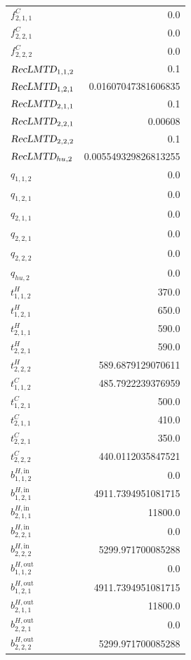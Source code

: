 \documentclass{article}%
\begin{document}
\begin{multicols*}{3}
\begin{supertabular}{lr}
	$f_{2,1,1}^{C}$ & 0.0 \\%
	$f_{2,2,1}^{C}$ & 0.0 \\%
	$f_{2,2,2}^{C}$ & 0.0 \\%
	$\textsl{RecLMTD}_{1,1,2}$ & 0.1 \\%
	$\textsl{RecLMTD}_{1,2,1}$ & 0.01607047381606835 \\%
	$\textsl{RecLMTD}_{2,1,1}$ & 0.1 \\%
	$\textsl{RecLMTD}_{2,2,1}$ & 0.00608 \\%
	$\textsl{RecLMTD}_{2,2,2}$ & 0.1 \\%
	$\textsl{RecLMTD}_{hu,2}$ & 0.005549329826813255 \\%
	$q_{1,1,2}$ & 0.0 \\%
	$q_{1,2,1}$ & 0.0 \\%
	$q_{2,1,1}$ & 0.0 \\%
	$q_{2,2,1}$ & 0.0 \\%
	$q_{2,2,2}$ & 0.0 \\%
	$q_{hu,2}$ & 0.0 \\%
	$t_{1,1,2}^{H}$ & 370.0 \\%
	$t_{1,2,1}^{H}$ & 650.0 \\%
	$t_{2,1,1}^{H}$ & 590.0 \\%
	$t_{2,2,1}^{H}$ & 590.0 \\%
	$t_{2,2,2}^{H}$ & 589.6879129070611 \\%
	$t_{1,1,2}^{C}$ & 485.7922239376959 \\%
	$t_{1,2,1}^{C}$ & 500.0 \\%
	$t_{2,1,1}^{C}$ & 410.0 \\%
	$t_{2,2,1}^{C}$ & 350.0 \\%
	$t_{2,2,2}^{C}$ & 440.0112035847521 \\%
	$b_{1,1,2}^{H,\text{in}}$ & 0.0 \\%
	$b_{1,2,1}^{H,\text{in}}$ & 4911.7394951081715 \\%
	$b_{2,1,1}^{H,\text{in}}$ & 11800.0 \\%
	$b_{2,2,1}^{H,\text{in}}$ & 0.0 \\%
	$b_{2,2,2}^{H,\text{in}}$ & 5299.971700085288 \\%
	$b_{1,1,2}^{H,\text{out}}$ & 0.0 \\%
	$b_{1,2,1}^{H,\text{out}}$ & 4911.7394951081715 \\%
	$b_{2,1,1}^{H,\text{out}}$ & 11800.0 \\%
	$b_{2,2,1}^{H,\text{out}}$ & 0.0 \\%
	$b_{2,2,2}^{H,\text{out}}$ & 5299.971700085288 \\%

\end{supertabular}
\end{multicols*}
\end{document}
